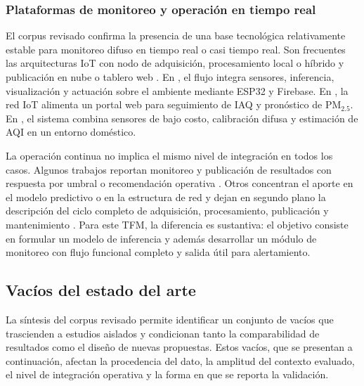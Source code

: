 \subsubsection{Plataformas de monitoreo y operación en tiempo real}
El corpus revisado confirma la presencia de una base tecnológica relativamente estable para monitoreo difuso en tiempo real o casi tiempo real. Son frecuentes las arquitecturas IoT con nodo de adquisición, procesamiento local o híbrido y publicación en nube o tablero web \cite{ART05,ART06,A114,A135,A167}. En \cite{A114}, el flujo integra sensores, inferencia, visualización y actuación sobre el ambiente mediante ESP32 y Firebase. En \cite{A135}, la red IoT alimenta un portal web para seguimiento de IAQ y pronóstico de PM$_{2.5}$. En \cite{A167}, el sistema combina sensores de bajo costo, calibración difusa y estimación de AQI en un entorno doméstico.

La operación continua no implica el mismo nivel de integración en todos los casos. Algunos trabajos reportan monitoreo y publicación de resultados con respuesta por umbral o recomendación operativa \cite{ART05,A114,A165,A167}. Otros concentran el aporte en el modelo predictivo o en la estructura de red y dejan en segundo plano la descripción del ciclo completo de adquisición, procesamiento, publicación y mantenimiento \cite{A028,ART08}. Para este TFM, la diferencia es sustantiva: el objetivo consiste en formular un modelo de inferencia y además desarrollar un módulo de monitoreo con flujo funcional completo y salida útil para alertamiento.

\subsection{Vacíos del estado del arte}
La síntesis del corpus revisado permite identificar un conjunto de vacíos que trascienden a estudios aislados y condicionan tanto la comparabilidad de resultados como el diseño de nuevas propuestas. Estos vacíos, que se presentan a continuación, afectan la procedencia del dato, la amplitud del contexto evaluado, el nivel de integración operativa y la forma en que se reporta la validación.

